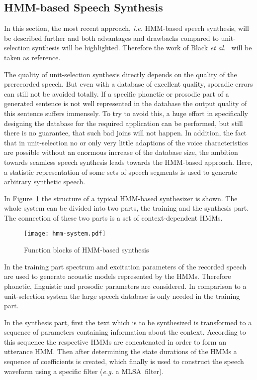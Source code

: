\subsection{\ac{HMM}-based Speech Synthesis}
\label{subsec:hmmspeech}

In this section, the most recent approach, \textit{i.e.} \ac{HMM}-based speech synthesis, will be described further and both advantages and drawbacks compared to unit-selection synthesis will be highlighted. Therefore the work of Black \textit{et al.}~\cite{black:statistical} will be taken as reference.

The quality of unit-selection synthesis directly depends on the quality of the prerecorded speech. But even with a database of excellent quality, sporadic errors can still not be avoided totally. If a specific phonetic or prosodic part of a generated sentence is not well represented in the database the output quality of this sentence suffers immensely. To try to avoid this, a huge effort in specifically designing the database for the required application can be performed, but still there is no guarantee, that such bad joins will not happen. In addition, the fact that in unit-selection no or only very little adaptions of the voice characteristics are possible without an enormous increase of the database size, the ambition towards seamless speech synthesis leads towards the \ac{HMM}-based approach. Here, a statistic representation of some sets of speech segments is used to generate arbitrary synthetic speech.

In Figure~\ref{fig:hmm} the structure of a typical \ac{HMM}-based synthesizer is shown. The whole system can be divided into two parts, the training and the synthesis part. The connection of these two parts is a set of context-dependent \acp{HMM}. 

\begin{figure}[h]
	\texttt{[image: hmm-system.pdf]}
	\caption{Function blocks of \ac{HMM}-based synthesis~\cite{black:statistical}}
	\label{fig:hmm}
\end{figure}

In the training part spectrum and excitation parameters %
of the recorded speech are used to generate acoustic models represented by the \acp{HMM}. Therefore phonetic, linguistic and prosodic parameters are considered. In comparison to a unit-selection system the large speech database is only needed in the training part.

In the synthesis part, first the text which is to be synthesized is transformed to a sequence of parameters containing information about the context. %
According to this sequence the respective \acp{HMM} are concatenated in order to form an utterance \ac{HMM}. Then after determining the state durations of the \acp{HMM} a sequence of coefficients is created, which finally is used to construct the speech waveform using a specific filter (\textit{e.g.} a \ac{MLSA}~filter). %

